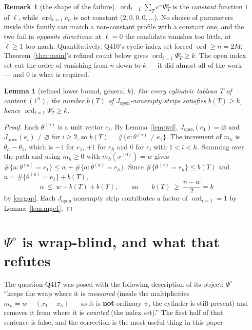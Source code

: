 \documentclass[11pt]{article}
\theoremstyle{plain}
\newtheorem{lemma}[theorem]{Lemma}
\theoremstyle{definition}
\newtheorem{remark}[theorem]{Remark}
\newcommand{\Jop}{J_{\mathrm{open}}}
\newcommand{\Psiop}{\Psi^{\circ}}
\newcommand{\ord}{\operatorname{ord}}
\begin{document}
\begin{remark}[the shape of the failure]
$\ord_{t=1}\sum_T c^-\Psiop_T$ is the \emph{constant} function $1$ of $\ell$, while
$\ord_{t=1}c_\alpha$ is not constant ($2,0,0,0,\dots$). No choice of parameters inside this
family can match a non-constant profile with a constant one, and the two fail in \emph{opposite
directions}: at $\ell=0$ the candidate vanishes too little, at $\ell\ge1$ too much.
Quantitatively, Q410's cyclic index set forced $\ord\ge n=2M$; Theorem~\ref{thm:main}'s refined
count below gives $\ord_{t=1}\Psiop_T\ge k$. The open index set cut the order of vanishing from
$n$ down to $k$ --- it did almost all of the work --- and $0$ is what is required.
\end{remark}

\begin{lemma}[refined lower bound, general $k$]\label{lem:kbound}
For every cylindric tableau $T$ of content $(1^n)$, the number $b(T)$ of $\Jop$-nonempty strips
satisfies $b(T)\ge k$, hence $\ord_{t=1}\Psiop_T\ge k$.
\end{lemma}

\begin{proof}
Each $\theta^{(a)}$ is a unit vector $e_{i}$. By Lemma~\ref{lem:wd},
$\Jop(e_1)=\varnothing$ and $\Jop(e_i)\ne\varnothing$ for $i\ge2$, so
$b(T)=\#\{a:\theta^{(a)}\ne e_1\}$. The increment of $m_h$ is $\theta_h-\theta_1$, which is $-1$
for $e_1$, $+1$ for $e_h$ and $0$ for $e_i$ with $1<i<h$. Summing over the path and using
$m_h\ge0$ with $m_h(x^{(0)})=w$ gives $\#\{a:\theta^{(a)}=e_1\}\le w+\#\{a:\theta^{(a)}=e_h\}$.
Since $\#\{\theta^{(a)}=e_h\}\le b(T)$ and $n=\#\{\theta^{(a)}=e_1\}+b(T)$,
\[
n\ \le\ w+b(T)+b(T),\qquad\text{so}\qquad b(T)\ \ge\ \frac{n-w}{2}=k
\]
by \eqref{eq:gap}. Each $\Jop$-nonempty strip contributes a factor of $\ord_{t=1}=1$ by
Lemma~\ref{lem:mge1}.
\end{proof}

\section{\texorpdfstring{$\Psiop$}{Psi-open} is wrap-blind, and what that refutes}

The question Q417 was posed with the following description of its object: $\Psiop$
``keeps the wrap where it is \emph{measured} (inside the multiplicities
$m_h=w-(x_1-x_h)$ --- so it is \textbf{not} ordinary $\psi$, the cylinder is still present) and
removes it from where it is \emph{counted} (the index set).'' The first half of that sentence is
false, and the correction is the most useful thing in this paper.
\end{document}
